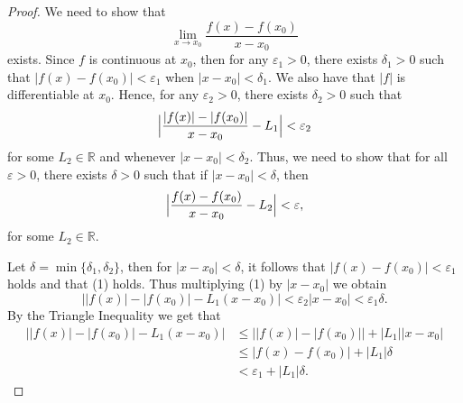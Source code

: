 \documentclass[12pt]{article}
\theoremstyle{definition}
\newcommand{\abs}[1]{\lvert #1 \rvert}
\newcommand{\bigabs}[1]{\Bigl \lvert #1 \Bigr \rvert}
\begin{document}
\begin{enumerate}
\begin{proof}
                We need to show that 
                    \begin{equation*}
                        \lim_{x\to x_ 0}\frac{f(x)-f(x_0)}{x-x_0}
                    \end{equation*}
                exists. Since $f$ is continuous at $x_0$, then for any
                $\varepsilon_1>0$, there exists $\delta_1>0$ such that
                $\abs{f(x)-f(x_0)}<\varepsilon_1$ when $\abs{x-x_0}<\delta_1$.
                We also have that $\abs{f}$ is differentiable at $x_0$. Hence,
                for any $\varepsilon_2>0$, there exists $\delta_2>0$ such that 
                    \begin{equation}
                        \bigabs{\frac{\abs{f(x)}-\abs{f(x_0)}}{x-x_0}-L_1}<\varepsilon_2
                    \end{equation}
                for some $L_2\in\mathbb{R}$ and whenever
                $\abs{x-x_0}<\delta_2$. Thus, we need to show that for all
                $\varepsilon>0$, there exists $\delta>0$ such that if
                $\abs{x-x_0}<\delta$, then
                    \begin{equation}
                        \bigabs{\frac{f(x)-f(x_0)}{x-x_0}-L_2}<\varepsilon,
                    \end{equation}
                for some $L_2\in\mathbb{R}$.\par\hspace{4mm} Let
                $\delta=\min\{\delta_1, \delta_2\}$, then for
                $\abs{x-x_0}<\delta$, it follows that
                $\abs{f(x)-f(x_0)}<\varepsilon_1$ holds and that (1) holds.
                Thus multiplying (1) by $\abs{x-x_0}$ we obtain
                    \begin{equation*}
                        \abs{\abs{f(x)}-\abs{f(x_0)}-L_1(x-x_0)}
                        <\varepsilon_2\abs{x-x_0}<\varepsilon_1\delta.
                    \end{equation*}
                By the Triangle Inequality we get that 
                    \begin{equation*}
                        \begin{split}
                            \abs{\abs{f(x)}-\abs{f(x_0)}-L_1(x-x_0)}
                            &\leq\abs{\abs{f(x)}-\abs{f(x_0)}}+\abs{L_1}\abs{x-x_0}
                            \\
                            &\leq\abs{f(x)-f(x_0)}+\abs{L_1}\delta \\
                            &<\varepsilon_1+\abs{L_1}\delta.

\end{split}
\end{equation*}
\end{proof}
\end{enumerate}
\end{document}
